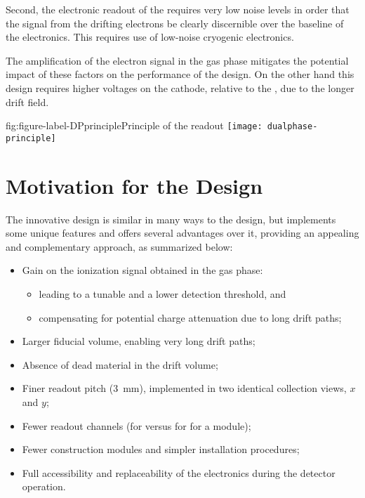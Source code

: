 Second, the electronic readout of the \lartpc{} requires very low noise levels in order that the signal from the drifting electrons be clearly discernible over the baseline of the electronics.  This requires use of low-noise cryogenic electronics. 

The amplification of the electron signal in the gas phase mitigates the potential impact of these factors on the performance of the \dual design.  On the other hand this design requires  higher voltages on the cathode, relative to the \single, due to the longer drift field. 

\begin{dunefigure}{fig:figure-label-DPprinciple}{Principle of the \dual readout}
\texttt{[image: dualphase-principle]}
\end{dunefigure}

\section{Motivation for the \dual Design} 
\label{sec:dp-execsum-design-motivation}

The innovative \dual design is similar in many ways to the \single design, but implements some unique features and offers several advantages over it, providing an appealing and complementary approach, as summarized below:

\begin{itemize}
\item Gain on the ionization signal obtained in the gas phase:
\begin{itemize}
\item  leading to a tunable  and a lower detection threshold, and
\item  compensating for potential charge attenuation due to long drift paths; 
\end{itemize}
\item  Larger fiducial volume, enabling very long drift paths;
\item  Absence of dead material in the \lar drift volume;
\item  Finer readout pitch (\SI{3}{mm}), implemented in two identical collection views, $x$ and $y$;
\item  Fewer readout channels (\dpnumcrpch for \dual versus \spnumch for \single for a  \nominalmodsize module); 
\item  Fewer construction modules and simpler installation procedures;
\item  Full accessibility and replaceability of the  electronics during the detector operation.
\end{itemize}

